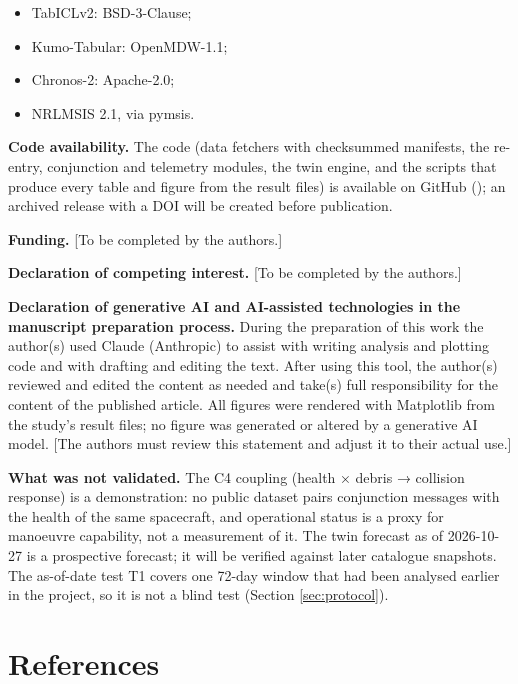 \documentclass[
]{article}
\providecommand{\tightlist}{%
  \setlength{\itemsep}{0pt}\setlength{\parskip}{0pt}}
\begin{document}
\begin{itemize}
\tightlist
\item
  TabICLv2: BSD-3-Clause;
\item
  Kumo-Tabular: OpenMDW-1.1;
\item
  Chronos-2: Apache-2.0;
\item
  NRLMSIS 2.1, via pymsis.
\end{itemize}

\textbf{Code availability.} The code (data fetchers with checksummed
manifests, the re-entry, conjunction and telemetry modules, the twin
engine, and the scripts that produce every table and figure from the
result files) is available on GitHub
(); an
archived release with a DOI will be created before publication.

\textbf{Funding.} {[}To be completed by the authors.{]}

\textbf{Declaration of competing interest.} {[}To be completed by the
authors.{]}

\textbf{Declaration of generative AI and AI-assisted technologies in the
manuscript preparation process.} During the preparation of this work the
author(s) used Claude (Anthropic) to assist with writing analysis and
plotting code and with drafting and editing the text. After using this
tool, the author(s) reviewed and edited the content as needed and
take(s) full responsibility for the content of the published article.
All figures were rendered with Matplotlib from the study's result files;
no figure was generated or altered by a generative AI model. {[}The
authors must review this statement and adjust it to their actual use.{]}

\textbf{What was not validated.} The C4 coupling (health × debris →
collision response) is a demonstration: no public dataset pairs
conjunction messages with the health of the same spacecraft, and
operational status is a proxy for manoeuvre capability, not a
measurement of it. The twin forecast as of 2026-10-27 is a prospective
forecast; it will be verified against later catalogue snapshots. The
as-of-date test T1 covers one 72-day window that had been analysed
earlier in the project, so it is not a blind test (Section
\ref{sec:protocol}).

\section*{References}\label{references}
\end{document}
